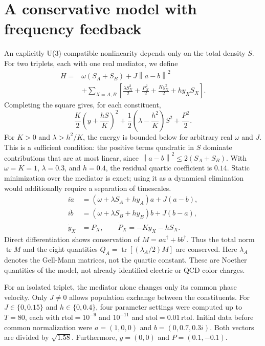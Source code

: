 \documentclass[a4paper,11pt]{article}
\newcommand{\norm}[1]{\left\lVert#1\right\rVert}
\begin{document}
\section{A conservative model with frequency feedback}\label{sec:mediator}
An explicitly U(3)-compatible nonlinearity depends only on the total density $S$. For two triplets, each with one real mediator, we define
\begin{equation}\label{eq:mediatorH}
\begin{aligned}
H={}&\omega(S_A+S_B)+J\norm{a-b}^2\\
&+\sum_{X=A,B}\left[\frac{\lambda S_X^2}{2}+\frac{P_X^2}{2}
+\frac{Ky_X^2}{2}+hy_XS_X\right].
\end{aligned}
\end{equation}
Completing the square gives, for each constituent,
\begin{equation}\label{eq:square}
\frac K2\left(y+\frac{hS}{K}\right)^2
+\frac12\left(\lambda-\frac{h^2}{K}\right)S^2+\frac{P^2}{2}.
\end{equation}
For $K>0$ and $\lambda>h^2/K$, the energy is bounded below for arbitrary real $\omega$ and $J$. This is a sufficient condition: the positive terms quadratic in $S$ dominate contributions that are at most linear, since $\norm{a-b}^2\leq2(S_A+S_B)$. With $\omega=K=1$, $\lambda=0.3$, and $h=0.4$, the residual quartic coefficient is $0.14$. Static minimization over the mediator is exact; using it as a dynamical elimination would additionally require a separation of timescales.
\begin{equation}\label{eq:mediatorEOM}
\begin{aligned}
i\dot a&=(\omega+\lambda S_A+hy_A)a+J(a-b),\\
i\dot b&=(\omega+\lambda S_B+hy_B)b+J(b-a),\\
\dot y_X&=P_X,\qquad \dot P_X=-Ky_X-hS_X.
\end{aligned}
\end{equation}
Direct differentiation shows conservation of $M=aa^\dagger+bb^\dagger$. Thus the total norm $\operatorname{tr}M$ and the eight quantities $Q_A=\operatorname{tr}[(\lambda_A/2)M]$ are conserved. Here $\lambda_A$ denotes the Gell-Mann matrices, not the quartic constant. These are Noether quantities of the model, not already identified electric or QCD color charges.

For an isolated triplet, the mediator alone changes only its common phase velocity. Only $J\ne0$ allows population exchange between the constituents. For $J\in\{0,0.15\}$ and $h\in\{0,0.4\}$, four parameter settings were computed up to $T=80$, each with $\mathrm{rtol}=10^{-9}$ and $10^{-11}$ and $\mathrm{atol}=0.01\,\mathrm{rtol}$. Initial data before common normalization were $a=(1,0,0)$ and $b=(0,0.7,0.3i)$. Both vectors are divided by $\sqrt{1.58}$. Furthermore, $y=(0,0)$ and $P=(0.1,-0.1)$.
\end{document}
